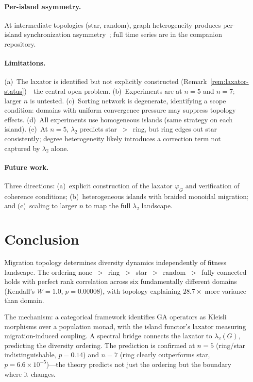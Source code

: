 \documentclass[submission,copyright,creativecommons]{eptcs}
\begin{document}
\paragraph{Per-island asymmetry.}
At intermediate topologies (star, random), graph heterogeneity
produces per-island synchronization
asymmetry~\cite{zhou2026defect}; full time series are in the
companion repository.

\paragraph{Limitations.}
(a)~The laxator is identified but not explicitly constructed
(Remark~\ref{rem:laxator-status})---the central open problem.
(b)~Experiments are at $n{=}5$ and $n{=}7$; larger $n$ is
untested.
(c)~Sorting network is degenerate, identifying a scope condition:
domains with uniform convergence pressure may suppress topology
effects.
(d)~All experiments use homogeneous islands (same strategy on each
island).
(e)~At $n{=}5$, $\lambda_2$ predicts star~$>$~ring, but ring
edges out star consistently; degree heterogeneity likely introduces
a correction term not captured by $\lambda_2$ alone.

\paragraph{Future work.}
Three directions: (a)~explicit construction of the laxator
$\varphi_G$ and verification of coherence conditions;
(b)~heterogeneous islands with braided monoidal migration; and
(c)~scaling to larger $n$ to map the full $\lambda_2$ landscape.

\section{Conclusion}
\label{sec:conclusion}

Migration topology determines diversity dynamics independently of
fitness landscape. The ordering
none~$>$~ring~$>$~star~$>$~random~$>$~fully connected holds with
perfect rank correlation across six fundamentally different
domains (Kendall's $W = 1.0$, $p = 0.00008$), with topology
explaining $28.7\times$ more variance than domain.

The mechanism: a categorical framework identifies GA operators as
Kleisli morphisms over a population monad, with the island functor's
laxator measuring migration-induced coupling. A spectral bridge
connects the laxator to $\lambda_2(G)$, predicting the diversity
ordering. The prediction is confirmed at $n{=}5$ (ring/star
indistinguishable, $p = 0.14$) and $n{=}7$ (ring clearly
outperforms star, $p = 6.6 \times 10^{-5}$)---the theory predicts
not just the ordering but the boundary where it changes.
\end{document}
